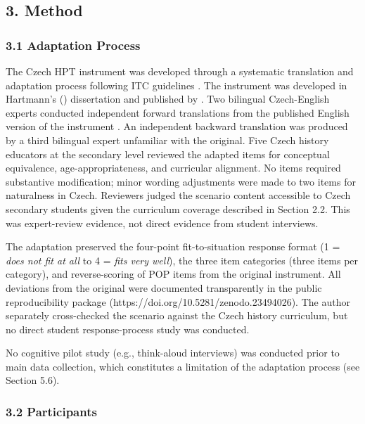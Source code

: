 \documentclass[
  12pt,
]{article}
\newcommand{\Loc}[1]{\linelabel{loc:#1}}
\newcommand{\LocEnd}[1]{\linelabel{loc:#1:end}}
\begin{document}
\hypertarget{method}{%
\subsection{3. Method}\label{method}}

\hypertarget{adaptation-process}{%
\subsubsection{3.1 Adaptation Process}\label{adaptation-process}}

The Czech HPT instrument was developed through a systematic translation and adaptation process following ITC guidelines \citep{ITC2017}. \Loc{s31-source}The instrument was developed in Hartmann's (\citeyear{Hartmann2008}) dissertation and published by \citet{Hartmann_Hasselhorn2008Historical}. Two bilingual Czech-English experts conducted independent forward translations from the published English version of the instrument \citep{Hartmann_Hasselhorn2008Historical}.\LocEnd{s31-source} An independent backward translation was produced by a third bilingual expert unfamiliar with the original. Five Czech history educators at the secondary level reviewed the adapted items for conceptual equivalence, age-appropriateness, and curricular alignment. No items required substantive modification; minor wording adjustments were made to two items for naturalness in Czech. Reviewers judged the scenario content accessible to Czech secondary students given the curriculum coverage described in Section 2.2. This was expert-review evidence, not direct evidence from student interviews.

The adaptation preserved the four-point fit-to-situation response format
(1 = \emph{does not fit at all} to 4 = \emph{fits very well}), the three item
categories (three items per category), and reverse-scoring of POP items from
the original instrument. All deviations from the original were documented
transparently in the public reproducibility package
(https://doi.org/10.5281/zenodo.23494026).
The author separately cross-checked the scenario against the Czech history
curriculum, but no direct student response-process study was conducted.

No cognitive pilot study (e.g., think-aloud interviews) was conducted prior to main data collection, which constitutes a limitation of the adaptation process (see Section 5.6).

\hypertarget{participants}{%
\subsubsection{3.2 Participants}\label{participants}}
\end{document}
